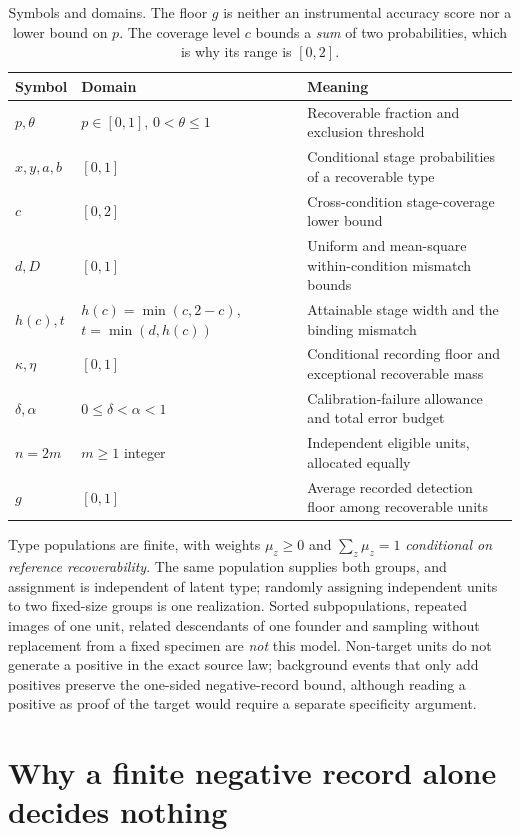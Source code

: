 \documentclass[11pt]{article}
\theoremstyle{definition}
\theoremstyle{remark}
\newcommand{\hc}{h(c)}
\begin{document}
\begin{table}[ht]
\centering\small
\begin{tabularx}{\linewidth}{@{}l l Y@{}}
\toprule
Symbol & Domain & Meaning\\
\midrule
$p,\theta$ & $p\in[0,1]$, $0<\theta\le1$ & Recoverable fraction and exclusion threshold\\
$x,y,a,b$ & $[0,1]$ & Conditional stage probabilities of a recoverable type\\
$c$ & $[0,2]$ & Cross-condition stage-coverage lower bound\\
$d,D$ & $[0,1]$ & Uniform and mean-square within-condition mismatch bounds\\
$\hc,t$ & $\hc=\min(c,2-c)$, $t=\min(d,\hc)$ & Attainable stage width and the binding mismatch\\
$\kappa,\eta$ & $[0,1]$ & Conditional recording floor and exceptional recoverable mass\\
$\delta,\alpha$ & $0\le\delta<\alpha<1$ & Calibration-failure allowance and total error budget\\
$n=2m$ & $m\ge1$ integer & Independent eligible units, allocated equally\\
$g$ & $[0,1]$ & Average recorded detection floor among recoverable units\\
\bottomrule
\end{tabularx}
\caption{Symbols and domains. The floor $g$ is neither an instrumental accuracy
score nor a lower bound on $p$. The coverage level $c$ bounds a \emph{sum} of two
probabilities, which is why its range is $[0,2]$.}
\label{tab:symbols}
\end{table}

Type populations are finite, with weights $\mu_z\ge0$ and $\sum_z\mu_z=1$
\emph{conditional on reference recoverability}. The same population supplies both
groups, and assignment is independent of latent type; randomly assigning
independent units to two fixed-size groups is one realization. Sorted
subpopulations, repeated images of one unit, related descendants of one founder
and sampling without replacement from a fixed specimen are \emph{not} this
model. Non-target units do not generate a positive in the exact source law;
background events that only add positives preserve the one-sided negative-record
bound, although reading a positive as proof of the target would require a
separate specificity argument.

\section{Why a finite negative record alone decides nothing}\label{sec:obstruction}
\end{document}
